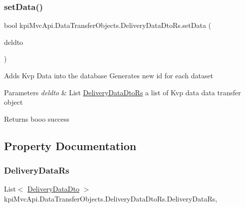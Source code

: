\subsubsection{\texorpdfstring{set\+Data()}{setData()}\hspace{0.1cm}{\footnotesize\ttfamily [2/2]}}
{\footnotesize\ttfamily bool kpi\+Mvc\+Api.\+Data\+Transfer\+Objects.\+Delivery\+Data\+Dto\+Rs.\+set\+Data (\begin{DoxyParamCaption}\item[{List$<$ \hyperlink{classkpi_mvc_api_1_1_data_transfer_objects_1_1_delivery_data_dto}{Delivery\+Data\+Dto} $>$}]{deldto }\end{DoxyParamCaption})\hspace{0.3cm}{\ttfamily [inline]}}



Adds Kvp Data into the database Generates new id for each dataset 


\begin{DoxyParams}{Parameters}
{\em deldto} & {\ttfamily  List \hyperlink{classkpi_mvc_api_1_1_data_transfer_objects_1_1_delivery_data_dto_rs}{Delivery\+Data\+Dto\+Rs} } a list of Kvp data data transfer object \\
\hline
\end{DoxyParams}
\begin{DoxyReturn}{Returns}
{\ttfamily booo} success
\end{DoxyReturn}


\subsection{Property Documentation}
\mbox{\label{classkpi_mvc_api_1_1_data_transfer_objects_1_1_delivery_data_dto_rs_ae096dfea7797a7e0614150291a66c7bf}} 
\subsubsection{\texorpdfstring{Delivery\+Data\+Rs}{DeliveryDataRs}}
{\footnotesize\ttfamily List$<$ \hyperlink{classkpi_mvc_api_1_1_data_transfer_objects_1_1_delivery_data_dto}{Delivery\+Data\+Dto} $>$ kpi\+Mvc\+Api.\+Data\+Transfer\+Objects.\+Delivery\+Data\+Dto\+Rs.\+Delivery\+Data\+Rs\hspace{0.3cm}{\ttfamily [get]}, {\ttfamily [set]}}



